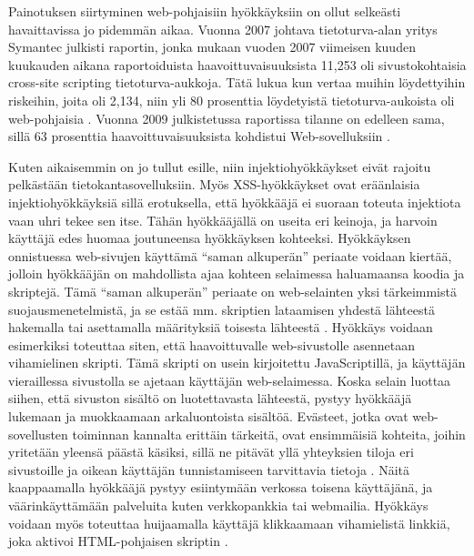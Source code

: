 Painotuksen siirtyminen web-pohjaisiin hyökkäyksiin on ollut selkeästi havaittavissa jo pidemmän aikaa. Vuonna 2007 johtava tietoturva-alan 
yritys Symantec julkisti raportin, jonka  mukaan vuoden 2007 viimeisen kuuden kuukauden aikana raportoiduista haavoittuvaisuuksista 11,253
oli sivustokohtaisia cross-site scripting tietoturva-aukkoja. Tätä lukua kun vertaa muihin löydettyihin riskeihin, joita oli 2,134, niin 
yli 80 prosenttia löydetyistä tietoturva-aukoista oli web-pohjaisia \cite{SYM}. Vuonna 2009 julkistetussa raportissa tilanne on edelleen sama, 
sillä 63 prosenttia haavoittuvaisuuksista kohdistui Web-sovelluksiin \cite{SYM2}.

Kuten aikaisemmin on jo tullut esille, niin injektiohyökkäykset eivät rajoitu pelkästään tietokantasovelluksiin. Myös XSS-hyökkäykset ovat eräänlaisia 
injektiohyökkäyksiä sillä erotuksella, että hyökkääjä ei suoraan toteuta injektiota vaan uhri tekee sen itse. Tähän hyökkääjällä on useita eri 
keinoja, ja harvoin käyttäjä edes huomaa joutuneensa hyökkäyksen kohteeksi. Hyökkäyksen onnistuessa web-sivujen käyttämä ``saman alkuperän'' periaate
voidaan kiertää, jolloin hyökkääjän on mahdollista ajaa kohteen selaimessa haluamaansa koodia ja skriptejä. Tämä ``saman alkuperän'' periaate on 
web-selainten yksi tärkeimmistä suojausmenetelmistä, ja se estää mm. skriptien lataamisen yhdestä lähteestä hakemalla tai asettamalla määrityksiä 
toisesta lähteestä \cite{WEB2}. Hyökkäys voidaan esimerkiksi toteuttaa siten, että haavoittuvalle web-sivustolle asennetaan vihamielinen skripti.
Tämä skripti on usein kirjoitettu JavaScriptillä, ja käyttäjän vieraillessa sivustolla se ajetaan käyttäjän web-selaimessa. Koska selain luottaa siihen, 
että sivuston sisältö on luotettavasta lähteestä, pystyy hyökkääjä lukemaan ja muokkaamaan arkaluontoista sisältöä. Evästeet, jotka ovat web-sovellusten 
toiminnan kannalta erittäin tärkeitä, ovat ensimmäisiä kohteita, joihin yritetään yleensä päästä käsiksi,  sillä ne pitävät yllä yhteyksien tiloja eri 
sivustoille ja oikean käyttäjän tunnistamiseen tarvittavia tietoja \cite{WEB2b}. Näitä kaappaamalla hyökkääjä pystyy esiintymään verkossa toisena käyttäjänä, 
ja väärinkäyttämään palveluita kuten verkkopankkia tai webmailia. Hyökkäys voidaan myös toteuttaa huijaamalla käyttäjä klikkaamaan vihamielistä linkkiä, 
joka aktivoi HTML-pohjaisen skriptin \cite{WEB2}.

